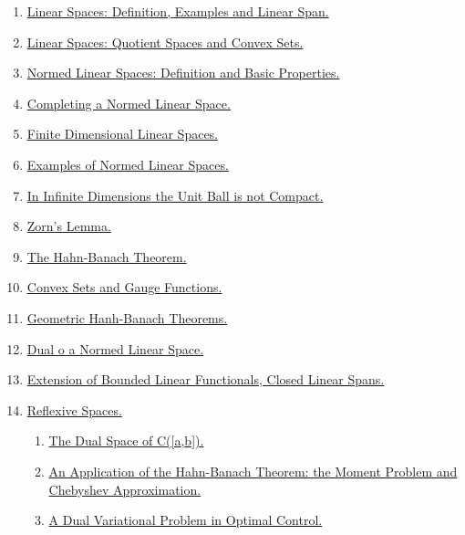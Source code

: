 \documentclass[11pt]{article}
\begin{document}
\begin{enumerate}
	\item  \href{https://mp.weixin.qq.com/s/31noYsQCVBUwL4gon-xEXw}{Linear Spaces: Definition, Examples and Linear Span.} %
	\item  \href{https://mp.weixin.qq.com/s/VwvCvoFwbf1WEC0qFkcgOw}{Linear Spaces: Quotient Spaces and Convex Sets.} %
	\item  \href{https://mp.weixin.qq.com/s/YAjwN-rNBZ1rcaEj2FHRWg}{Normed Linear Spaces: Definition and Basic Properties.} %
	\item  \href{https://mp.weixin.qq.com/s/NYydI1Z_jMx6jawXUU0cJQ}{Completing a Normed Linear Space.} %
	\item  \href{https://mp.weixin.qq.com/s/WduGLBOqcXibbUKE_ffTQw}{Finite Dimensional Linear Spaces.} %
	\item  \href{https://mp.weixin.qq.com/s/9imaUe39l6Fw_eJzPEtV6A}{Examples of Normed Linear Spaces.} %
	\item  \href{https://mp.weixin.qq.com/s/jJ083Tx9l3kQ866A1ykfMQ}{In Infinite Dimensions the Unit Ball is not Compact.} %
	\item  \href{https://mp.weixin.qq.com/s/_rXF0h5vp3J7SA6z1elhNg}{Zorn's Lemma.} %
	\item  \href{https://mp.weixin.qq.com/s/PwtKSUgPS4fK841ascRN3A}{The Hahn-Banach Theorem.} %
	\item  \href{https://mp.weixin.qq.com/s/NkORGJ0XK8olbsbC9FOPhQ}{Convex Sets and Gauge Functions.} %
	\item  \href{https://mp.weixin.qq.com/s/BT8w36jLSLtgvBhsl5JliA}{Geometric Hanh-Banach Theorems.} %
	\item  \href{https://mp.weixin.qq.com/s/czKghXVYsL4L3zbjj0Y6qQ}{Dual o a Normed Linear Space.} %
	\item  \href{https://mp.weixin.qq.com/s/bDVf8DLW-ZOC8bHJ45Swjw}{Extension of Bounded Linear Functionals, Closed Linear Spans.} %
	\item  \href{https://mp.weixin.qq.com/s/BVhVTgMhJrDmEhGbUoPBqg}{Reflexive Spaces.} %
	\begin{enumerate}
		\item \href{https://mp.weixin.qq.com/s/qC45agvaGUygRifKgUPhkw}{The Dual Space of C([a,b]).}
		\item \href{https://mp.weixin.qq.com/s/bnbzCYhMj-wfkwr5o6MpLA}{An Application of the Hahn-Banach Theorem: the Moment Problem and Chebyshev Approximation.}
		\item \href{https://mp.weixin.qq.com/s/FJl9skrqchkOFYmTIDDHOw}{A Dual Variational Problem in Optimal Control.}

\end{enumerate}
\end{enumerate}
\end{document}
